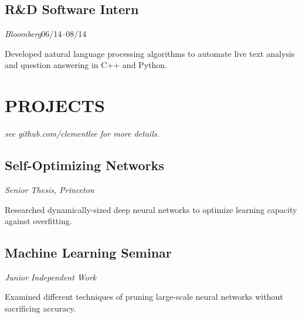 \documentclass[11pt]{article}
\begin{document}
\begin{minipage}[t]{0.55\textwidth}
  \medskip
  \subsection*{R\&D Software Intern}
  \emph{Bloomberg}\hfill 06/14--08/14
  \smallskip

  Developed natural language processing algorithms to automate live text analysis and question answering in C++ and Python.

  \bigskip
  \section*{\LARGE PROJECTS}
  \emph{see github.com/clementlee for more details.}
  
  \medskip
  \subsection*{Self-Optimizing Networks}
  \emph{Senior Thesis, Princeton}
  \smallskip

  Researched dynamically-sized deep neural networks to optimize learning capacity against overfitting.

  \medskip
  \subsection*{Machine Learning Seminar}
  \emph{Junior Independent Work}
  \smallskip

  Examined different techniques of pruning large-scale neural networks without sacrificing accuracy.
  

  
\end{minipage}
\end{document}
